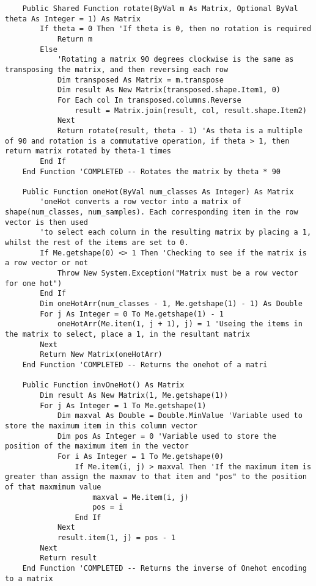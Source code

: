 \begin{verbatim}
    Public Shared Function rotate(ByVal m As Matrix, Optional ByVal theta As Integer = 1) As Matrix
        If theta = 0 Then 'If theta is 0, then no rotation is required
            Return m
        Else
            'Rotating a matrix 90 degrees clockwise is the same as transposing the matrix, and then reversing each row
            Dim transposed As Matrix = m.transpose
            Dim result As New Matrix(transposed.shape.Item1, 0)
            For Each col In transposed.columns.Reverse
                result = Matrix.join(result, col, result.shape.Item2)
            Next
            Return rotate(result, theta - 1) 'As theta is a multiple of 90 and rotation is a commutative operation, if theta > 1, then return matrix rotated by theta-1 times
        End If
    End Function 'COMPLETED -- Rotates the matrix by theta * 90
    
    Public Function oneHot(ByVal num_classes As Integer) As Matrix
        'oneHot converts a row vector into a matrix of shape(num_classes, num_samples). Each corresponding item in the row vector is then used
        'to select each column in the resulting matrix by placing a 1, whilst the rest of the items are set to 0.
        If Me.getshape(0) <> 1 Then 'Checking to see if the matrix is a row vector or not
            Throw New System.Exception("Matrix must be a row vector for one hot")
        End If
        Dim oneHotArr(num_classes - 1, Me.getshape(1) - 1) As Double
        For j As Integer = 0 To Me.getshape(1) - 1
            oneHotArr(Me.item(1, j + 1), j) = 1 'Useing the items in the matrix to select, place a 1, in the resultant matrix
        Next
        Return New Matrix(oneHotArr)
    End Function 'COMPLETED -- Returns the onehot of a matri
    
    Public Function invOneHot() As Matrix
        Dim result As New Matrix(1, Me.getshape(1))
        For j As Integer = 1 To Me.getshape(1)
            Dim maxval As Double = Double.MinValue 'Variable used to store the maximum item in this column vector
            Dim pos As Integer = 0 'Variable used to store the position of the maximum item in the vector
            For i As Integer = 1 To Me.getshape(0)
                If Me.item(i, j) > maxval Then 'If the maximum item is greater than assign the maxmav to that item and "pos" to the position of that maxmimum value
                    maxval = Me.item(i, j)
                    pos = i
                End If
            Next
            result.item(1, j) = pos - 1
        Next
        Return result
    End Function 'COMPLETED -- Returns the inverse of Onehot encoding to a matrix
    

\end{verbatim}
